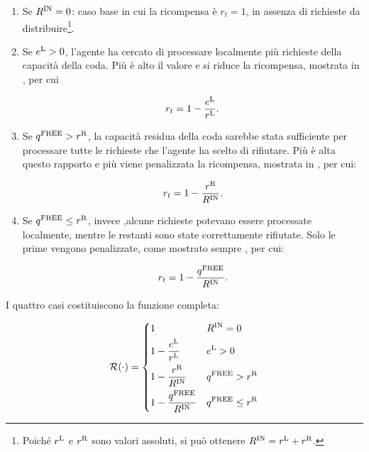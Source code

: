 \begin{enumerate}
    \item Se $R^\textnormal{IN} = 0$: caso base in cui la ricompensa è $r_t = 1$, in assenza di richieste da distribuire\footnote{Poiché $r^\textnormal{L}$ e $r^\textnormal{R}$ sono valori assoluti, si può ottenere $R^\textnormal{IN} = r^\textnormal{L} + r^\textnormal{R}$.}.

    \item Se $e^\textnormal{L} > 0$, l'agente ha cercato di processare localmente più richieste della capacità della coda. Più è alto il valore e si riduce la ricompensa, mostrata in , per cui

    \begin{equation}
        r_t = 1 - \frac{e^\textnormal{L}}{r^\textnormal{L}}.
    \end{equation}

    \item Se $q^\textnormal{FREE} > r^\textnormal{R}$, la capacità residua della coda sarebbe stata sufficiente per processare tutte le richieste che l'agente ha scelto di rifiutare. Più è alta questo rapporto e più viene penalizzata la ricompensa, mostrata in , per cui:

    \begin{equation}
        r_t = 1 - \frac{r^\textnormal{R}}{R^\textnormal{IN}}.
    \end{equation}

    \item Se $q^\textnormal{FREE} \le r^\textnormal{R}$, invece ,alcune richieste potevano essere processate localmente, mentre le restanti sono state correttamente rifiutate. Solo le prime vengono penalizzate, come mostrato sempre , per cui:

    \begin{equation}
        r_t = 1 - \frac{q^\textnormal{FREE}}{R^\textnormal{IN}}.
    \end{equation}
\end{enumerate}

I quattro casi costituiscono la funzione completa:

\begin{equation}
    \mathcal{R}(\cdot) = \begin{dcases}
        1 & R^\textnormal{IN} = 0 \\
        1 - \frac{e^\textnormal{L}}{r^\textnormal{L}} & e^\textnormal{L} > 0 \\
        1 - \frac{r^\textnormal{R}}{R^\textnormal{IN}} & q^\textnormal{FREE} > r^\textnormal{R} \\
        1 - \frac{q^\textnormal{FREE}}{R^\textnormal{IN}} & q^\textnormal{FREE} \le r^\textnormal{R}
    \end{dcases}
\end{equation}

